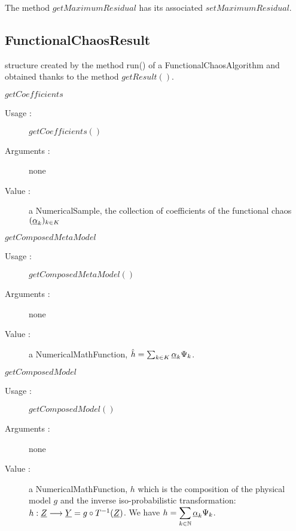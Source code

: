 The method $getMaximumResidual$ has its associated $setMaximumResidual$.




\subsection{FunctionalChaosResult}


\begin{description}

\item[Usage :]  structure created by the method run() of a  FunctionalChaosAlgorithm and obtained thanks to the method $getResult()$.


\item[Some methods :]  \rule{0pt}{1em}
  \begin{description}

  \item $getCoefficients$
    \begin{description}
    \item[Usage :] $getCoefficients()$
    \item[Arguments :] none
    \item[Value :] a NumericalSample, the collection of coefficients of the functional chaos $({\underline{\alpha}}_k)_{k\in K}$
    \end{description}
    \bigskip 

  \item $getComposedMetaModel$
    \begin{description}
    \item[Usage :] $getComposedMetaModel()$
    \item[Arguments :] none
    \item[Value :] a NumericalMathFunction, $\hat{h} =\sum_{k \in K} {\underline{\alpha}}_k \Psi_k$.
    \end{description}
    \bigskip


  \item $getComposedModel$
    \begin{description}
    \item[Usage :] $getComposedModel()$
    \item[Arguments :] none
    \item[Value :] a NumericalMathFunction, $h$ which is the composition of the physical model $g$ and the inverse iso-probabilistic transformation: $h : {\underline{Z}} \longrightarrow {\underline{Y}} = g \circ T^{-1}({\underline{Z}})$. We have  $\displaystyle h =  \sum_{k \in \mathbb{N}} {\underline{\alpha}}_k \Psi_k$.
    \end{description}
    \bigskip


\end{description}
\end{description}

